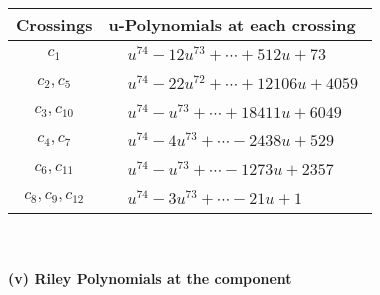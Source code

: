 \documentclass[1p]{elsarticle_modified}
\theoremstyle{definition}
\begin{document}
\begin{tabular}{m{50pt}|m{274pt}}
Crossings & \hspace{64pt}u-Polynomials at each crossing \\
\hline $$\begin{aligned}c_{1}\end{aligned}$$&$\begin{aligned}
&u^{74}-12 u^{73}+\cdots+512 u+73
\end{aligned}$\\
\hline $$\begin{aligned}c_{2},c_{5}\end{aligned}$$&$\begin{aligned}
&u^{74}-22 u^{72}+\cdots+12106 u+4059
\end{aligned}$\\
\hline $$\begin{aligned}c_{3},c_{10}\end{aligned}$$&$\begin{aligned}
&u^{74}- u^{73}+\cdots+18411 u+6049
\end{aligned}$\\
\hline $$\begin{aligned}c_{4},c_{7}\end{aligned}$$&$\begin{aligned}
&u^{74}-4 u^{73}+\cdots-2438 u+529
\end{aligned}$\\
\hline $$\begin{aligned}c_{6},c_{11}\end{aligned}$$&$\begin{aligned}
&u^{74}- u^{73}+\cdots-1273 u+2357
\end{aligned}$\\
\hline $$\begin{aligned}c_{8},c_{9},c_{12}\end{aligned}$$&$\begin{aligned}
&u^{74}-3 u^{73}+\cdots-21 u+1
\end{aligned}$\\
\hline
\end{tabular}\\~\\
\newpage\renewcommand{\arraystretch}{1}
\flushleft \textbf{(v) Riley Polynomials at the component}\newline \\
\end{document}
